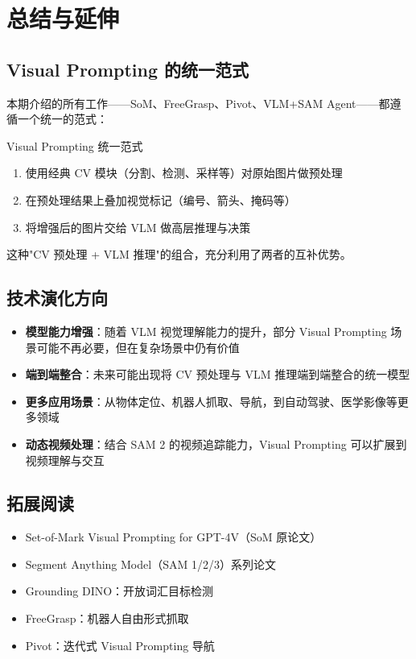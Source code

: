 \section{总结与延伸}

\subsection{Visual Prompting 的统一范式}

本期介绍的所有工作——SoM、FreeGrasp、Pivot、VLM+SAM Agent——都遵循一个统一的范式：

\begin{importantbox}{Visual Prompting 统一范式}
\begin{enumerate}
    \item 使用经典 CV 模块（分割、检测、采样等）对原始图片做预处理
    \item 在预处理结果上叠加视觉标记（编号、箭头、掩码等）
    \item 将增强后的图片交给 VLM 做高层推理与决策
\end{enumerate}
这种"CV 预处理 + VLM 推理"的组合，充分利用了两者的互补优势。
\end{importantbox}

\subsection{技术演化方向}

\begin{itemize}
    \item \textbf{模型能力增强}：随着 VLM 视觉理解能力的提升，部分 Visual Prompting 场景可能不再必要，但在复杂场景中仍有价值
    \item \textbf{端到端整合}：未来可能出现将 CV 预处理与 VLM 推理端到端整合的统一模型
    \item \textbf{更多应用场景}：从物体定位、机器人抓取、导航，到自动驾驶、医学影像等更多领域
    \item \textbf{动态视频处理}：结合 SAM 2 的视频追踪能力，Visual Prompting 可以扩展到视频理解与交互
\end{itemize}

\subsection{拓展阅读}

\begin{itemize}
    \item Set-of-Mark Visual Prompting for GPT-4V（SoM 原论文）
    \item Segment Anything Model（SAM 1/2/3）系列论文
    \item Grounding DINO：开放词汇目标检测
    \item FreeGrasp：机器人自由形式抓取
    \item Pivot：迭代式 Visual Prompting 导航
\end{itemize}



